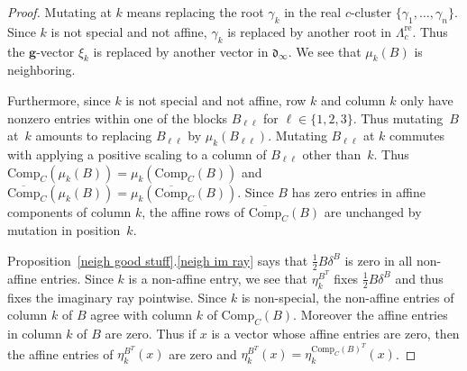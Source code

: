 \documentclass{amsart}
\theoremstyle{definition}
\theoremstyle{remark}
\numberwithin{equation}{section}
\newcommand{\reals}{\mathbb R}
\newcommand{\set}[1]{{\lbrace #1 \rbrace}}
\newcommand{\0}{{\mathbf{0}}}
\newcommand{\Comp}{\mathrm{Comp}_C}
\newcommand{\CompPlus}{\overline{\mathrm{Comp}}_C}
\newcommand{\g}{\mathbf{g}}
\newcommand{\re}{\mathrm{re}}
\renewcommand{\d}{{\mathfrak d}}
\newcommand{\APTChar}{\Lambda}
\newcommand{\APT}[1]{\APTChar_{#1}}
\newcommand{\APTre}[1]{\APT{#1}^\re}
\begin{document}
\begin{proof}
Mutating at $k$ means replacing the root $\gamma_k$ in the real $c$-cluster $\set{\gamma_1,\ldots,\gamma_n}$.
Since $k$ is not special and not affine, $\gamma_k$ is replaced by another root in $\APTre{c}$.
Thus the $\g$-vector $\xi_k$ is replaced by another vector in $\d_\infty$.
We see that $\mu_k(B)$ is neighboring.

Furthermore, since $k$ is not special and not affine, row $k$ and column $k$ only have nonzero entries within one of the blocks $B_{\ell\ell}$ for $\ell\in\set{1,2,3}$.
Thus mutating~$B$ at~$k$ amounts to replacing $B_{\ell\ell}$ by $\mu_k(B_{\ell\ell})$.
Mutating $B_{\ell\ell}$ at $k$ commutes with applying a positive scaling to a column of $B_{\ell\ell}$ other than~$k$.
Thus $\Comp(\mu_k(B))=\mu_k(\Comp(B))$ and ${\CompPlus(\mu_k(B))=\mu_k(\CompPlus(B))}$.
Since $B$ has zero entries in affine components of column $k$, the affine rows of $\CompPlus(B)$ are unchanged by mutation in position~$k$.

Proposition~\ref{neigh good stuff}.\ref{neigh im ray} says that $\frac12B\delta^B$ is zero in all non-affine entries.
Since $k$ is a non-affine entry, we see that $\eta^{B^T}_k$ fixes $\frac12B\delta^B$ and thus fixes the imaginary ray pointwise.
Since $k$ is non-special, the non-affine entries of column $k$ of $B$ agree with column $k$ of $\Comp(B)$.
Moreover the affine entries in column $k$ of $B$ are zero.
Thus if $x$ is a vector whose affine entries are zero, then the affine entries of $\eta^{B^T}_k(x)$ are zero and $\eta^{B^T}_k(x)=\eta^{\Comp(B)^T}_k(x)$.
\end{proof}
\end{document}
